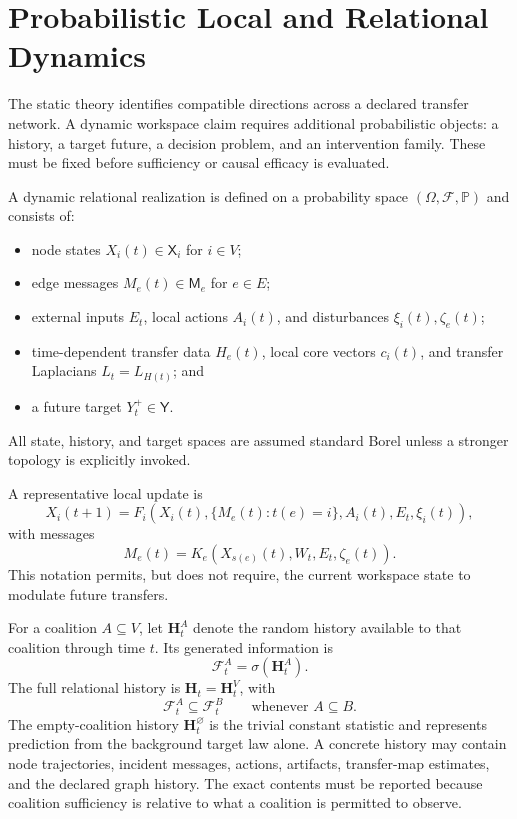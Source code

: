 \section{Probabilistic Local and Relational Dynamics}

The static theory identifies compatible directions across a declared transfer
network. A dynamic workspace claim requires additional probabilistic objects:
a history, a target future, a decision problem, and an intervention family.
These must be fixed before sufficiency or causal efficacy is evaluated.

\begin{SRWTdefinition}\label{SRWT:def:dynamic-realization}
A dynamic relational realization is defined on a probability space
\((\Omega,\mathcal F,\mathbb P)\) and consists of:
\begin{itemize}
\item node states \(X_i(t)\in\mathsf X_i\) for \(i\in V\);
\item edge messages \(M_e(t)\in\mathsf M_e\) for \(e\in E\);
\item external inputs \(E_t\), local actions \(A_i(t)\), and disturbances
 \(\xi_i(t),\zeta_e(t)\);
\item time-dependent transfer data \(H_e(t)\), local core vectors \(c_i(t)\),
 and transfer Laplacians \(L_t=L_{H(t)}\); and
\item a future target \(Y_t^+\in\mathsf Y\).
\end{itemize}
All state, history, and target spaces are assumed standard Borel unless a
stronger topology is explicitly invoked.
\end{SRWTdefinition}

A representative local update is
\[
X_i(t+1)
=
F_i\!\left(
X_i(t),
\{M_e(t):t(e)=i\},
A_i(t),E_t,\xi_i(t)
\right),
\]
with messages
\[
M_e(t)
=
K_e\!\left(
X_{s(e)}(t),
W_t,
E_t,\zeta_e(t)
\right).
\]
This notation permits, but does not require, the current workspace state to
modulate future transfers.

For a coalition \(A\subseteq V\), let \(\mathbf H_t^A\) denote the random
history available to that coalition through time \(t\). Its generated
information is
\[
\mathcal F_t^A=\sigma(\mathbf H_t^A).
\]
The full relational history is \(\mathbf H_t=\mathbf H_t^V\), with
\[
\mathcal F_t^A\subseteq\mathcal F_t^B
\qquad
\text{whenever }A\subseteq B.
\]
The empty-coalition history \(\mathbf H_t^\varnothing\) is the trivial
constant statistic and represents prediction from the background target law
alone.
A concrete history may contain node trajectories, incident messages, actions,
artifacts, transfer-map estimates, and the declared graph history. The exact
contents must be reported because coalition sufficiency is relative to what a
coalition is permitted to observe.

